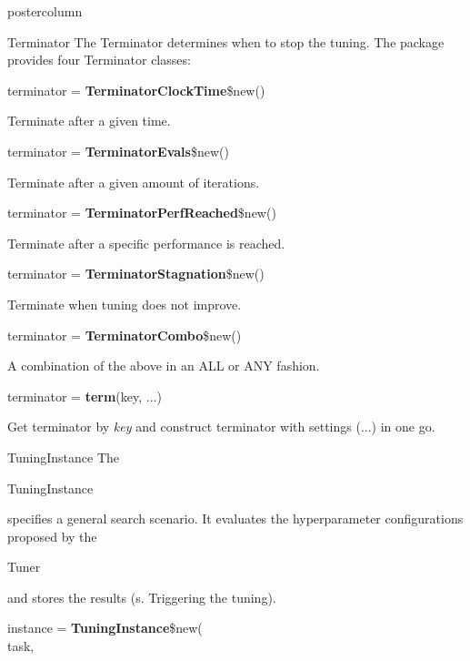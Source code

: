 \documentclass{beamer}
\newlength{\columnheight} %
\newcommand{\codeinline}[1]{\begin{codeboxinline}#1\end{codeboxinline}}
\begin{document}
\begin{frame}[fragile]{}
\begin{columns}
\begin{column}{.245\textwidth}
\begin{beamercolorbox}[center]{postercolumn}
				\begin{minipage}{.98\textwidth}
					\parbox[t][\columnheight]{\textwidth}{
						\begin{myblock}{Terminator}
						The Terminator determines when to stop the tuning. The package provides four Terminator classes:
						\\
						\begin{codebox}
							terminator = \textbf{TerminatorClockTime}\$new()
						\end{codebox}
						Terminate after a given time.
						\\
						\begin{codebox}
							terminator = \textbf{TerminatorEvals}\$new()
						\end{codebox}
						Terminate after a given amount of iterations. 
						\\
						\begin{codebox}
							terminator = \textbf{TerminatorPerfReached}\$new()
						\end{codebox}
						Terminate after a specific performance is reached.  
						\\
						\begin{codebox}
							terminator = \textbf{TerminatorStagnation}\$new()
						\end{codebox}
						Terminate when tuning does not improve.
						\\
						\begin{codebox}
							terminator = \textbf{TerminatorCombo}\$new()
						\end{codebox}
						A combination of the above in an ALL or ANY fashion.
						\\
						\begin{codebox}
							terminator = \textbf{term}(key, ...)
						\end{codebox}
						Get terminator by \textit{key} and construct terminator with settings (...) in one go. 
					\end{myblock}	
				\begin{myblock}{TuningInstance}
					The \codeinline{TuningInstance} specifies a general search scenario. It evaluates the hyperparameter configurations proposed by the \codeinline{Tuner} and stores the results (s. Triggering the tuning).
					\\
					\begin{codeboxmultiline}[width=18cm]
						instance = \textbf{TuningInstance}\$new(\\
						\hspace*{1ex}task,\\

\end{codeboxmultiline}
\end{myblock}}
\end{minipage}
\end{beamercolorbox}
\end{column}
\end{columns}
\end{frame}
\end{document}
